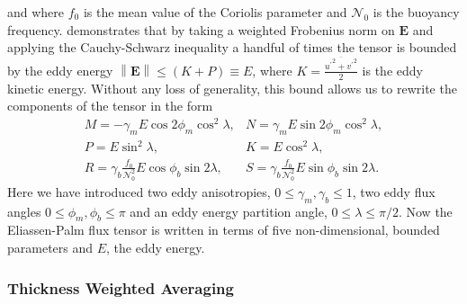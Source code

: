 \documentclass[10pt,a4paper]{article}
\newcommand*\mean[1]{\overline{#1}}
\newcommand*\res[1]{{#1}^{\prime}}
\begin{document}
                 and where $f_{0}$ is the mean value of the Coriolis parameter and $\mathcal{N}_{0}$ is the buoyancy frequency. \cite{marshall2012framework}
                demonstrates that by taking a weighted Frobenius norm on $\boldsymbol{E} $
                and applying the Cauchy-Schwarz inequality a handful of times the 
                 tensor is bounded by the eddy energy ${\left\|\boldsymbol{E}\right\|\leq\left(K+P\right)\equiv E}$,
                 where $K=\frac{\mean{{\res{u}}^{2} + {\res{v}}^{2}}}{2}$ is the eddy
                 kinetic energy.
                 Without any loss of generality, this bound allows us to rewrite the components of the tensor in the form
                 \begin{equation}
                 \begin{array}{cc}
                 M = -\gamma_{m}E\cos{2\phi_{m}}\cos^{2}{\lambda}, & 
                 N = \gamma_{m}E\sin{2\phi_{m}}\cos^{2}{\lambda}, \\
                 P =  E\sin^{2}{\lambda}, &  K =  E\cos^{2}{\lambda},  \\
                 R =  \gamma_{b}\frac{f_{0}}{\mathcal{N}_{0}^{2}}E\cos{\phi_{b}}\sin{2\lambda}, &
                 S = \gamma_{b}\frac{f_{0}}{\mathcal{N}_{0}^{2}}E\sin{\phi_{b}}\sin{2\lambda} .
                 \end{array} 
                 \end{equation}
                 Here we have introduced two eddy anisotropies, $0\leq\gamma_{m},\gamma_{b}\leq1$, two eddy flux angles $0\leq\phi_{m},\phi_{b}\leq\pi$ and an eddy energy partition angle,
                 $0\leq\lambda\leq\pi/2$. Now the Eliassen-Palm flux tensor
                 is written in terms of five non-dimensional, bounded parameters
                 and $E$, the eddy energy.
                 
                 
                 
                 \subsubsection{Thickness Weighted Averaging}
                 
\end{document}

